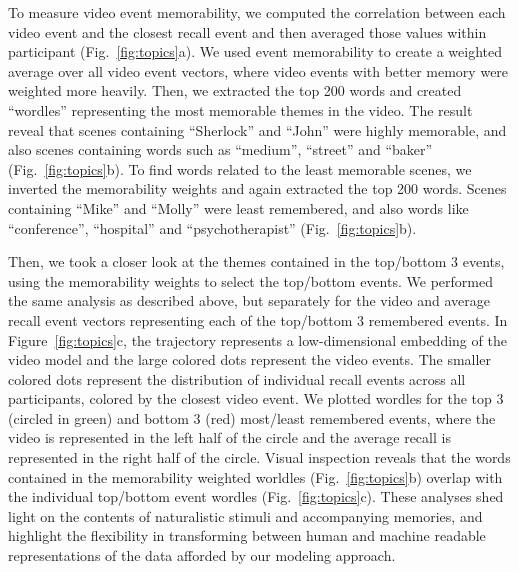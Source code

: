 \documentclass{article}
\begin{document}
{To measure video event memorability, we computed the correlation between each video event and the closest recall event and then averaged those values within participant (Fig.~\ref{fig:topics}a). We used event memorability to create a weighted average over all video event vectors, where video events with better memory were weighted more heavily. Then, we extracted the top 200 words and created ``wordles'' representing the most memorable themes in the video. The result reveal that scenes containing ``Sherlock'' and ``John'' were highly memorable, and also scenes containing words such as ``medium'', ``street'' and ``baker'' (Fig.~\ref{fig:topics}b). To find words related to the least memorable scenes, we inverted the memorability weights and again extracted the top 200 words.  Scenes containing ``Mike'' and ``Molly'' were least remembered, and also words like ``conference'', ``hospital'' and ``psychotherapist'' (Fig.~\ref{fig:topics}b).

Then, we took a closer look at the themes contained in the top/bottom 3 events, using the memorability weights to select the top/bottom events. We performed the same analysis as described above, but separately for the video and average recall event vectors representing each of the top/bottom 3 remembered events. In Figure~\ref{fig:topics}c, the trajectory represents a low-dimensional embedding of the video model and the large colored dots represent the video events. The smaller colored dots represent the distribution of individual recall events across all participants, colored by the closest video event. We plotted wordles for the top 3 (circled in green) and bottom 3 (red) most/least remembered events, where the video is represented in the left half of the circle and the average recall is represented in the right half of the circle. Visual inspection reveals that the words contained in the memorability weighted worldles (Fig.~\ref{fig:topics}b) overlap with the individual top/bottom event wordles (Fig.~\ref{fig:topics}c). These analyses shed light on the contents of naturalistic stimuli and accompanying memories, and highlight the flexibility in transforming between human and machine readable representations of the data afforded by our modeling approach.

}
\end{document}
